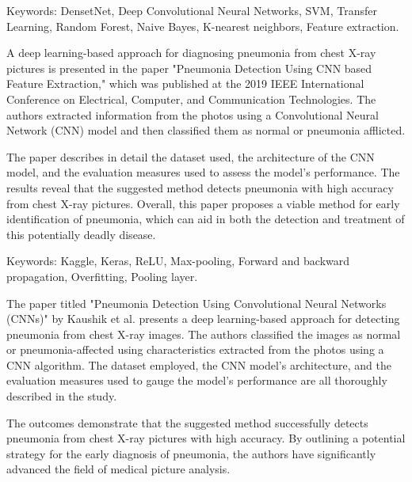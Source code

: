 %
%
%
%




{
	
	Keywords: DensetNet, Deep Convolutional Neural Networks, SVM, Transfer Learning, Random Forest, Naive Bayes, K-nearest neighbors, Feature extraction.\newline
	
	A deep learning-based approach for diagnosing pneumonia from chest X-ray pictures is presented in the paper "Pneumonia Detection Using CNN based Feature Extraction," which was published at the 2019 IEEE International Conference on Electrical, Computer, and Communication Technologies. The authors extracted information from the photos using a Convolutional Neural Network (CNN) model and then classified them as normal or pneumonia afflicted. \newpage
	
	The paper describes in detail the dataset used, the architecture of the CNN model, and the evaluation measures used to assess the model's performance. The results reveal that the suggested method detects pneumonia with high accuracy from chest X-ray pictures. Overall, this paper proposes a viable method for early identification of pneumonia, which can aid in both the detection and treatment of this potentially deadly disease.\cite{Varshni:2019}
	
	
}


{
	Keywords: Kaggle, Keras, ReLU, Max-pooling, Forward and backward propagation, Overﬁtting, Pooling layer.\newline
	
	The paper titled "Pneumonia Detection Using Convolutional Neural Networks (CNNs)" by Kaushik et al. presents a deep learning-based approach for detecting pneumonia from chest X-ray images.  The authors classified the images as normal or pneumonia-affected using characteristics extracted from the photos using a CNN algorithm. The dataset employed, the CNN model's architecture, and the evaluation measures used to gauge the model's performance are all thoroughly described in the study.\newpage
	
	The outcomes demonstrate that the suggested method successfully detects pneumonia from chest X-ray pictures with high accuracy. By outlining a potential strategy for the early diagnosis of pneumonia, the authors have significantly advanced the field of medical picture analysis.\cite{Kaushik:2020}
	
}
